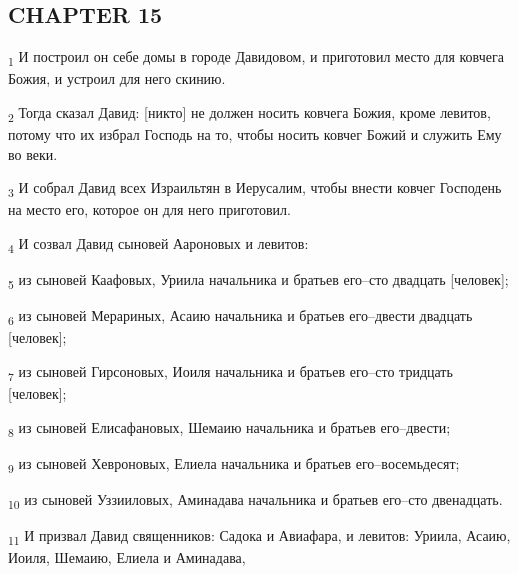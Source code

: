 \subsection{CHAPTER 15}
\begin{tcolorbox}
\textsubscript{1} И построил он себе домы в городе Давидовом, и приготовил место для ковчега Божия, и устроил для него скинию.
\end{tcolorbox}
\begin{tcolorbox}
\textsubscript{2} Тогда сказал Давид: [никто] не должен носить ковчега Божия, кроме левитов, потому что их избрал Господь на то, чтобы носить ковчег Божий и служить Ему во веки.
\end{tcolorbox}
\begin{tcolorbox}
\textsubscript{3} И собрал Давид всех Израильтян в Иерусалим, чтобы внести ковчег Господень на место его, которое он для него приготовил.
\end{tcolorbox}
\begin{tcolorbox}
\textsubscript{4} И созвал Давид сыновей Аароновых и левитов:
\end{tcolorbox}
\begin{tcolorbox}
\textsubscript{5} из сыновей Каафовых, Уриила начальника и братьев его--сто двадцать [человек];
\end{tcolorbox}
\begin{tcolorbox}
\textsubscript{6} из сыновей Мерариных, Асаию начальника и братьев его--двести двадцать [человек];
\end{tcolorbox}
\begin{tcolorbox}
\textsubscript{7} из сыновей Гирсоновых, Иоиля начальника и братьев его--сто тридцать [человек];
\end{tcolorbox}
\begin{tcolorbox}
\textsubscript{8} из сыновей Елисафановых, Шемаию начальника и братьев его--двести;
\end{tcolorbox}
\begin{tcolorbox}
\textsubscript{9} из сыновей Хевроновых, Елиела начальника и братьев его--восемьдесят;
\end{tcolorbox}
\begin{tcolorbox}
\textsubscript{10} из сыновей Уззииловых, Аминадава начальника и братьев его--сто двенадцать.
\end{tcolorbox}
\begin{tcolorbox}
\textsubscript{11} И призвал Давид священников: Садока и Авиафара, и левитов: Уриила, Асаию, Иоиля, Шемаию, Елиела и Аминадава,
\end{tcolorbox}
